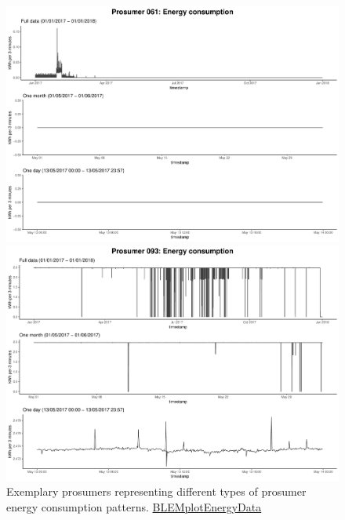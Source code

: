 \begin{figure}
    \begin{minipage}[h]{\dimexpr.5\textheight-0.15em}
    \includegraphics[width=\textwidth]{thesis/graphs/timeseries/p061_cons.pdf}
    \end{minipage}
    \begin{minipage}[h]{\dimexpr.5\textheight-0.15em}
    \includegraphics[width=\textwidth]{thesis/graphs/timeseries/p093_cons.pdf}
    \end{minipage}
    
    \caption[Examples for types of prosumer energy consumption patterns]{Exemplary prosumers representing different types of prosumer energy consumption patterns. \quantnet\href{https://github.com/QuantLet/BLEM/tree/master/BLEMplotEnergyData}{BLEMplotEnergyData}}
    \label{Fig:prosenergycons_peculiar}
\end{figure}

